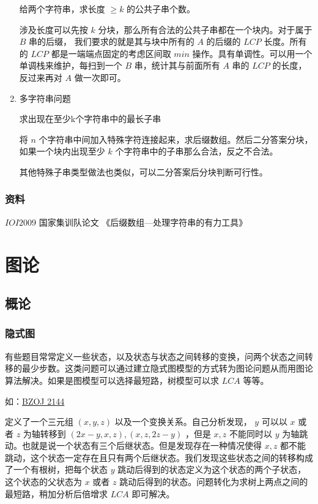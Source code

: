 \documentclass[11pt]{article}
\begin{document}
\begin{enumerate}
给两个字符串，求长度 $\geq k$ 的公共子串个数。

涉及长度可以先按 $k$ 分块，那么所有合法的公共子串都在一个块内。对于属于 $B$ 串的后缀， 我们要求的就是其与块中所有的 $A$ 的后缀的 $LCP$ 长度。所有的 $LCP$ 都是一端端点固定的考虑区间取 $min$ 操作。具有单调性。可以用一个单调栈来维护，每扫到一个 $B$ 串，统计其与前面所有 $A$ 串的 $LCP$ 的长度，反过来再对 $A$ 做一次即可。

\item 多字符串问题
\label{sec-5-3-3-10}

求出现在至少k个字符串中的最长子串

将 $n$ 个字符串中间加入特殊字符连接起来，求后缀数组。然后二分答案分块，如果一个块内出现至少 $k$ 个字符串中的子串那么合法，反之不合法。

其他特殊子串类型做法也类似，可以二分答案后分块判断可行性。
\end{enumerate}

\subsubsection{资料}
\label{sec-5-3-4}

$IOI2009$  国家集训队论文 《后缀数组—处理字符串的有力工具》
\section{图论}
\label{sec-6}
\subsection{概论}
\label{sec-6-1}
\subsubsection{隐式图}
\label{sec-6-1-1}

有些题目常常定义一些状态，以及状态与状态之间转移的变换，问两个状态之间转移的最少步数。这类问题可以通过建立隐式图模型的方式转为图论问题从而用图论算法解决。如果是图模型可以选择最短路，树模型可以求 $LCA$ 等等。

如：\href{http://www.lydsy.com/JudgeOnline/problem.php?id=2144}{BZOJ 2144}

定义了一个三元组 $(x,y,z)$ 以及一个变换关系。自己分析发现， $y$ 可以以 $x$ 或者 $z$ 为轴转移到 $(2x-y,x,z),(x,z,2z-y)$ ，但是 $x,z$ 不能同时以 $y$ 为轴跳动。也就是说一个状态有三个后继状态。但是发现存在一种情况使得 $x,z$ 都不能跳动，这个状态一定存在且只有两个后继状态。我们发现这些状态之间的转移构成了一个有根树，把每个状态 $y$ 跳动后得到的状态定义为这个状态的两个子状态，这个状态的父状态为 $x$ 或者 $z$ 跳动后得到的状态。问题转化为求树上两点之间的最短路，稍加分析后倍增求 $LCA$ 即可解决。
\end{document}

